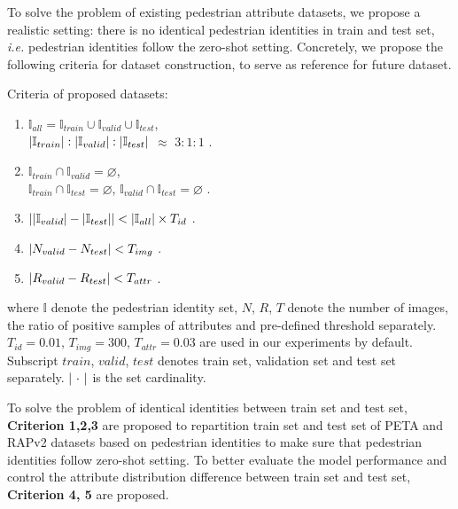 \documentclass[runningheads]{llncs}
\begin{document}
To solve the problem of existing pedestrian attribute datasets, we propose a realistic setting: there is no identical pedestrian identities in train and test set, \textit{i.e.} pedestrian identities follow the zero-shot setting. Concretely, we propose the following criteria for dataset construction, to serve as reference for future dataset.
\begin{description}
    \item[Criteria of proposed datasets:]
\end{description}
\begin{center}
  \begin{minipage}{0.9\linewidth}
    \begin{enumerate}
    \item $\mathbb{I}_{all} =\mathbb{I}_{train} \cup \mathbb{I}_{valid} \cup \mathbb{I}_{test}$, \\ $\abs{\mathbb{I}_{train}} :\abs{\mathbb{I}_{valid}} : \abs{\mathbb{I}_{test}}$ $\approx$  $ 3 : 1 : 1 $ .
    \item $\mathbb{I}_{train} \cap \mathbb{I}_{valid} = \varnothing$, \\$ \mathbb{I}_{train} \cap \mathbb{I}_{test} = \varnothing $, $\mathbb{I}_{valid} \cap \mathbb{I}_{test} = \varnothing $ .
    \item $\abs{ \abs{\mathbb{I}_{valid}} - \abs{\mathbb{I}_{test}} } < \abs{\mathbb{I}_{all}} \times  T_{id}$ .
\item $\abs{N_{valid} - N_{test}} < T_{img}$ .
    \item $\abs{R_{valid} - R_{test}} < T_{attr}$ .
    \end{enumerate}
  \end{minipage}
\end{center}
where $\mathbb{I}$ denote the pedestrian identity set, $N$, $R$, $T$ denote the number of images, the ratio of positive samples of attributes and pre-defined threshold separately. $T_{id} = 0.01$, $T_{img} = 300$, $T_{attr} = 0.03$ are used in our experiments by default. Subscript ${train}$, ${valid}$, ${test}$ denotes train set, validation set and test set separately. $\abs{\ \cdot \ }$ is the set cardinality.

To solve the problem of identical identities between train set and test set, \textbf{Criterion 1,2,3} are proposed to repartition train set and test set of PETA and RAPv2 datasets based on pedestrian identities to make sure that pedestrian identities follow zero-shot setting. To better evaluate the model performance and control the attribute distribution difference between train set and test set, \textbf{Criterion 4, 5} are proposed.
\end{document}

